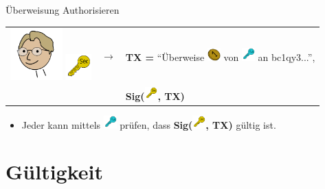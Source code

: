 \documentclass[aspectratio=169]{beamer}
\begin{document}
\begin{frame}{Überweisung Authorisieren}
    \begin{center}
        \begin{tabular}{ccl}
            \includegraphics[width=2cm]{../icons/Linus} \hspace*{-0.5cm} \includegraphics[width=1cm]{../icons/SecKey} & {\Huge$\longrightarrow$} & \textbf{TX =} ``Überweise \includegraphics[width=0.5cm]{../icons/Coin} von \includegraphics[width=0.5cm]{../icons/PubKey} an bc1qy3...'',\\
            & & \textbf{Sig(\includegraphics[width=0.5cm]{../icons/SecKey}, TX)}\\
        \end{tabular}
    \end{center}
    \vspace{1cm}
    \begin{itemize}
        \item Jeder kann mittels \includegraphics[width=0.5cm]{../icons/PubKey} prüfen, dass \textbf{Sig(\includegraphics[width=0.5cm]{../icons/SecKey}, TX)} gültig ist.
    \end{itemize}
\end{frame}





\section{Gültigkeit}
\end{document}
